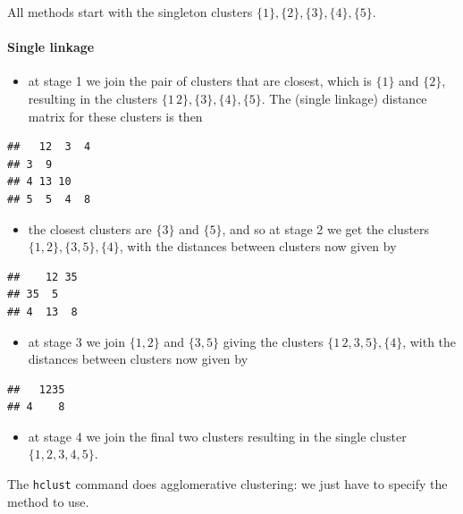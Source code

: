 \documentclass[
]{book}
\providecommand{\tightlist}{%
  \setlength{\itemsep}{0pt}\setlength{\parskip}{0pt}}
\theoremstyle{definition}
\theoremstyle{definition}
\theoremstyle{definition}
\theoremstyle{definition}
\theoremstyle{remark}
\begin{document}
All methods start with the singleton clusters \(\{1\},\{2\},\{3\},\{4\},\{5\}\).

\paragraph*{Single linkage}\label{single-linkage}

\begin{itemize}
\tightlist
\item
  at stage 1 we join the pair of clusters that are closest, which is \(\{1\}\) and \(\{2\}\), resulting in the clusters \(\{1\, 2\},\{3\},\{4\},\{5\}\). The (single linkage) distance matrix for these clusters is then
\end{itemize}

\begin{verbatim}
##   12  3  4
## 3  9      
## 4 13 10   
## 5  5  4  8
\end{verbatim}

\begin{itemize}
\tightlist
\item
  the closest clusters are \(\{3\}\) and \(\{5\}\), and so at stage 2
  we get the clusters \(\{1, 2\},\{3, 5\},\{4\}\), with the distances between clusters now given by
\end{itemize}

\begin{verbatim}
##    12 35
## 35  5   
## 4  13  8
\end{verbatim}

\begin{itemize}
\tightlist
\item
  at stage 3 we join \(\{1, 2\}\) and \(\{3, 5\}\) giving the clusters \(\{1\, 2, 3, 5\},\{4\}\), with the distances between clusters now given by
\end{itemize}

\begin{verbatim}
##   1235
## 4    8
\end{verbatim}

\begin{itemize}
\tightlist
\item
  at stage 4 we join the final two clusters resulting in the single cluster \(\{1, 2, 3, 4, 5\}\).
\end{itemize}

The \texttt{hclust} command does agglomerative clustering: we just have to specify the method to use.
\end{document}
